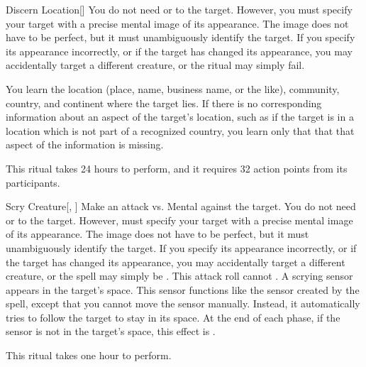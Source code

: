 \lowercase{\hypertarget{spell:Discern Location}{}}\label{spell:Discern Location}
\begin{apability}[Rank 5]{\hypertarget{spell:Discern Location}{Discern Location}}[]
You do not need  or  to the target.
However, you must specify your target with a precise mental image of its appearance.
The image does not have to be perfect, but it must unambiguously identify the target.
If you specify its appearance incorrectly, or if the target has changed its appearance, you may accidentally target a different creature, or the ritual may simply fail.

You learn the location (place, name, business name, or the like), community, country, and continent where the target lies.
If there is no corresponding information about an aspect of the target's location, such as if the target is in a location which is not part of a recognized country,
you learn only that that that aspect of the information is missing.

This ritual takes 24 hours to perform, and it requires 32 action points from its participants.
\end{apability}
\vspace{0.25em}



\lowercase{\hypertarget{spell:Scry Creature}{}}\label{spell:Scry Creature}
\begin{apability}[Rank 5]{\hypertarget{spell:Scry Creature}{Scry Creature}}[, ]
Make an attack vs. Mental against the target.
You do not need  or  to the target.
However,  must specify your target with a precise mental image of its appearance.
The image does not have to be perfect, but it must unambiguously identify the target.
If you specify its appearance incorrectly, or if the target has changed its appearance, you may accidentally target a different creature, or the spell may simply be .
This attack roll cannot .
\hit A scrying sensor appears in the target's space.
This sensor functions like the sensor created by the  spell, except that you cannot move the sensor manually.
Instead, it automatically tries to follow the target to stay in its space.
At the end of each phase, if the sensor is not in the target's space, this effect is .

This ritual takes one hour to perform.
\end{apability}
\vspace{0.25em}



